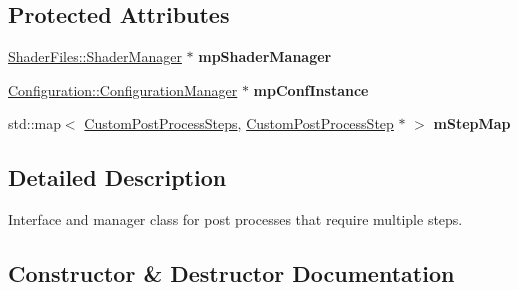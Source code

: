 \subsection*{Protected Attributes}
\begin{DoxyCompactItemize}
\item 
\mbox{\label{class_geometry_engine_1_1_custom_shading_1_1_custom_post_process_step_interface_a7c27a5e13cc89531f44e57427cc6e7f4}} 
\mbox{\hyperlink{class_shader_files_1_1_shader_manager}{Shader\+Files\+::\+Shader\+Manager}} $\ast$ {\bfseries mp\+Shader\+Manager}
\item 
\mbox{\label{class_geometry_engine_1_1_custom_shading_1_1_custom_post_process_step_interface_a9b3fec2a8f70316a4cfe395344815346}} 
\mbox{\hyperlink{class_configuration_1_1_configuration_manager}{Configuration\+::\+Configuration\+Manager}} $\ast$ {\bfseries mp\+Conf\+Instance}
\item 
\mbox{\label{class_geometry_engine_1_1_custom_shading_1_1_custom_post_process_step_interface_a633bd489293d41f32d7f6a31cbd77950}} 
std\+::map$<$ \mbox{\hyperlink{namespace_geometry_engine_1_1_custom_shading_a09e44ca81de5fe08c6d50271d680c4b1}{Custom\+Post\+Process\+Steps}}, \mbox{\hyperlink{class_geometry_engine_1_1_custom_shading_1_1_custom_post_process_step}{Custom\+Post\+Process\+Step}} $\ast$ $>$ {\bfseries m\+Step\+Map}
\end{DoxyCompactItemize}


\subsection{Detailed Description}
Interface and manager class for post processes that require multiple steps. 

\subsection{Constructor \& Destructor Documentation}
\mbox{\label{class_geometry_engine_1_1_custom_shading_1_1_custom_post_process_step_interface_a0f3c8845c42763b2eab5f8620ae95545}} 
